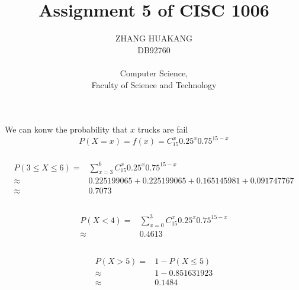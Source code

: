 \documentclass{article}
\title{Assignment 5 of CISC 1006}
\author{ZHANG HUAKANG \\ DB92760 \\ \\ Computer Science, \\Faculty of Science and Technology}
\begin{document}
    \maketitle
    \section{}
        \subsection{}
            We can konw the probability that $x$ trucks are fail
            $$P(X=x)=f(x)=C_15^x 0.25^x 0.75^{15-x}$$
            \subsubsection{}
                \begin{equation*}
                    \begin{split}
                        P(3\leq X\leq 6)=&\sum_{x=3}^6 C_15^x 0.25^x 0.75^{15-x}\\ 
                            \approx&0.225199065+0.225199065+0.165145981+0.091747767\\
                            \approx&0.7073\\                            
                    \end{split}
                \end{equation*}
            \subsubsection{}
                \begin{equation*}
                    \begin{split}
                        P(X<4)=&\sum_{x=0}^3 C_15^x 0.25^x 0.75^{15-x}\\
                            \approx&0.4613\\
                    \end{split}
                \end{equation*}
            \subsubsection{}
                \begin{equation*}
                    \begin{split}
                        P(X>5)=&1-P(X\leq 5)\\
                            \approx&1-0.851631923\\
                            \approx&0.1484\\
                    \end{split}
                \end{equation*}
\end{document}

